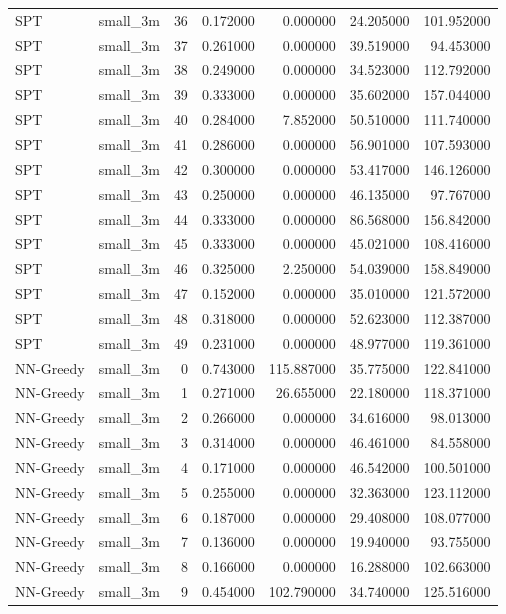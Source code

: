 \begin{tabular}{llrrrrr}
SPT & small_3m & 36 & 0.172000 & 0.000000 & 24.205000 & 101.952000 \\
SPT & small_3m & 37 & 0.261000 & 0.000000 & 39.519000 & 94.453000 \\
SPT & small_3m & 38 & 0.249000 & 0.000000 & 34.523000 & 112.792000 \\
SPT & small_3m & 39 & 0.333000 & 0.000000 & 35.602000 & 157.044000 \\
SPT & small_3m & 40 & 0.284000 & 7.852000 & 50.510000 & 111.740000 \\
SPT & small_3m & 41 & 0.286000 & 0.000000 & 56.901000 & 107.593000 \\
SPT & small_3m & 42 & 0.300000 & 0.000000 & 53.417000 & 146.126000 \\
SPT & small_3m & 43 & 0.250000 & 0.000000 & 46.135000 & 97.767000 \\
SPT & small_3m & 44 & 0.333000 & 0.000000 & 86.568000 & 156.842000 \\
SPT & small_3m & 45 & 0.333000 & 0.000000 & 45.021000 & 108.416000 \\
SPT & small_3m & 46 & 0.325000 & 2.250000 & 54.039000 & 158.849000 \\
SPT & small_3m & 47 & 0.152000 & 0.000000 & 35.010000 & 121.572000 \\
SPT & small_3m & 48 & 0.318000 & 0.000000 & 52.623000 & 112.387000 \\
SPT & small_3m & 49 & 0.231000 & 0.000000 & 48.977000 & 119.361000 \\
NN-Greedy & small_3m & 0 & 0.743000 & 115.887000 & 35.775000 & 122.841000 \\
NN-Greedy & small_3m & 1 & 0.271000 & 26.655000 & 22.180000 & 118.371000 \\
NN-Greedy & small_3m & 2 & 0.266000 & 0.000000 & 34.616000 & 98.013000 \\
NN-Greedy & small_3m & 3 & 0.314000 & 0.000000 & 46.461000 & 84.558000 \\
NN-Greedy & small_3m & 4 & 0.171000 & 0.000000 & 46.542000 & 100.501000 \\
NN-Greedy & small_3m & 5 & 0.255000 & 0.000000 & 32.363000 & 123.112000 \\
NN-Greedy & small_3m & 6 & 0.187000 & 0.000000 & 29.408000 & 108.077000 \\
NN-Greedy & small_3m & 7 & 0.136000 & 0.000000 & 19.940000 & 93.755000 \\
NN-Greedy & small_3m & 8 & 0.166000 & 0.000000 & 16.288000 & 102.663000 \\
NN-Greedy & small_3m & 9 & 0.454000 & 102.790000 & 34.740000 & 125.516000 \\

\end{tabular}
